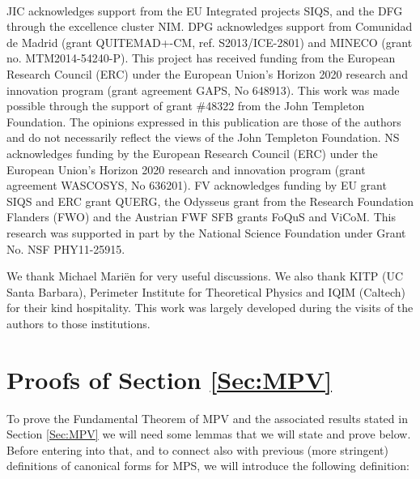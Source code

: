 \documentclass{elsarticle}
\begin{document}
\

JIC acknowledges support from the EU Integrated projects SIQS, and the DFG through the excellence cluster NIM.
DPG acknowledges support from
Comunidad de Madrid (grant QUITEMAD+-CM, ref. S2013/ICE-2801) and MINECO (grant no. MTM2014-54240-P).
This project has received funding from the European Research Council (ERC) under the European Union's Horizon 2020 research and innovation program (grant agreement GAPS, No 648913).
This work was made possible through the support of grant \#48322 from the John Templeton Foundation. The opinions expressed in this publication are those of the authors and do not necessarily reflect the views of the John Templeton Foundation.
NS acknowledges funding by the European Research Council (ERC) under the European Union's Horizon 2020 research and innovation program (grant agreement WASCOSYS, No 636201).
FV acknowledges funding by EU grant SIQS and ERC
grant QUERG, the Odysseus grant from the Research Foundation Flanders (FWO)
and the Austrian FWF SFB grants FoQuS and ViCoM.
This research was supported in part by the National Science Foundation under Grant No. NSF PHY11-25915.

We thank Michael Mari\"en for very useful discussions. We also thank KITP (UC Santa Barbara), Perimeter Institute for Theoretical Physics and IQIM (Caltech) for their kind hospitality. This work was largely developed during the visits of the authors to those institutions.

\appendix


\renewcommand{\thethm}{\Alph{section}.\arabic{thm}}



\section{Proofs of Section \ref{Sec:MPV}}\label{AppendixMPV}

To prove the Fundamental Theorem of MPV and the associated results stated in Section \ref{Sec:MPV} we will need some lemmas that we will state and prove below. Before entering into that, and to connect also with previous (more stringent) definitions of canonical forms for MPS, we will introduce the following definition:
\end{document}
